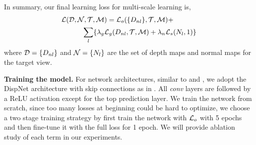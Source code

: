In summary, our final learning loss for multi-scale learning is,
\begin{align}
\label{eq:full_loss}
&{\mathcal L}({\mathcal D}, {\mathcal N}, {\mathcal T}, {\mathcal M}) = {\mathcal L}_{o}(\{D_{nl}\}, {\mathcal T}, {\mathcal M}) + \nonumber\\
&\text{~~~~~~~~~}\sum_l\{\lambda_g{\mathcal L}_{g}(D_{nl},{\mathcal T},{\mathcal M}) + \lambda_n{\mathcal L}_{s}(N_l, 1)\}
\end{align}
where ${\mathcal D} = \{D_{nl}\}$ and ${\mathcal N} = \{N_{l}\}$ are the set of depth maps and normal maps for the target view.


\textbf{Training the model.} For network architectures, similar to \cite{zhou2017unsupervised} and \cite{godard2016unsupervised}, we adopt the DispNet \cite{mayer2016large} architecture with skip connections as in \cite{zhou2017unsupervised}. All \textit{conv} layers are followed by a ReLU activation except for the top prediction layer. We train the network from scratch, since too many losses at beginning could be hard to optimize, we choose a two stage training strategy by first train the network with ${\mathcal L}_{o}$ with 5 epochs and then fine-tune it with the full loss for 1 epoch. We will provide ablation study of each term in our experiments.




